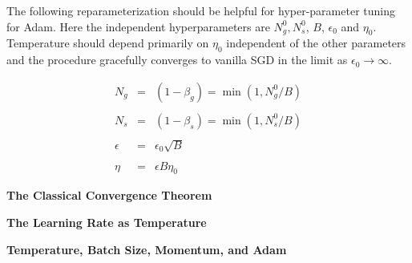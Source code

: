 {

{\huge
The following reparameterization should be helpful for hyper-parameter tuning for Adam.  Here the independent
hyperparameters are $N^0_g, N^0_s$, $B$, $\epsilon_0$ and $\eta_0$.  Temperature should depend primarily on $\eta_0$ independent of
the other parameters and the procedure gracefully converges to vanilla SGD in the limit as $\epsilon_0 \rightarrow \infty$.

\begin{eqnarray*}
N_g & = & (1-\beta_g) = \min(1,N^0_g/B) \\
\\
N_s & = & (1-\beta_s) = \min(1,N^0_s/B) \\
\\
\epsilon & = & \epsilon_0\sqrt{B} \\
\\
\eta & = & \epsilon B \eta_0
\end{eqnarray*}
}

  \centerline{\bf The Classical Convergence Theorem}
  \vfill
  \centerline{\bf The Learning Rate as Temperature}
  \vfill
  \centerline{\bf Temperature, Batch Size, Momentum, and Adam}


} 

